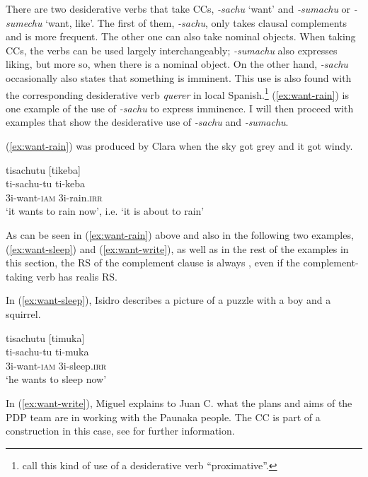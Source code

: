 There are two desiderative verbs that take CCs, \textit{-sachu} ‘want’ and \textit{-sumachu} or \textit{-sumechu} ‘want, like’. The first of them, \textit{-sachu}, only takes clausal complements and is more frequent. The other one can also take nominal objects. When taking CCs, the verbs can be used largely interchangeably; \textit{-sumachu} also expresses liking, but more so, when there is a nominal object. On the other hand, \textit{-sachu} occasionally also states that something is imminent. This use is also found with the corresponding desiderative verb \textit{querer} in local Spanish.\footnote{\citet[860]{Kuteva2019} call this kind of use of a desiderative verb “proximative”.} (\ref{ex:want-rain}) is one example of the use of \textit{-sachu} to express imminence. I will then proceed with examples that show the desiderative use of \textit{-sachu} and \textit{-sumachu}.

(\ref{ex:want-rain}) was produced by Clara when the sky got grey and it got windy.

\ea\label{ex:want-rain}
\begingl
\glpreamble tisachutu \textup{[}tikeba\textup{]}\\
\gla ti-sachu-tu ti-keba\\
\glb 3i-want-\textsc{iam} 3i-rain.\textsc{irr}\\
\glft ‘it wants to rain now’, i.e. ‘it is about to rain’
\endgl
\trailingcitation{[cux-120410ls.253]}
\xe

As can be seen in (\ref{ex:want-rain}) above and also in the following two examples, (\ref{ex:want-sleep}) and (\ref{ex:want-write}), as well as in the rest of the examples in this section, the RS of the complement clause is always , even if the complement-taking verb has realis RS.

 In (\ref{ex:want-sleep}), Isidro describes a picture of a puzzle with a boy and a squirrel.

\ea\label{ex:want-sleep}
\begingl
\glpreamble tisachutu \textup{[}timuka\textup{]}\\
\gla ti-sachu-tu ti-muka\\
\glb 3i-want-\textsc{iam} 3i-sleep.\textsc{irr}\\
\glft ‘he wants to sleep now’
\endgl
\trailingcitation{[dxx-d120416s.086]}
\xe

In (\ref{ex:want-write}), Miguel explains to Juan C. what the plans and aims of the PDP team are in working with the Paunaka people. The CC is part of a  construction in this case, see  for further information.

